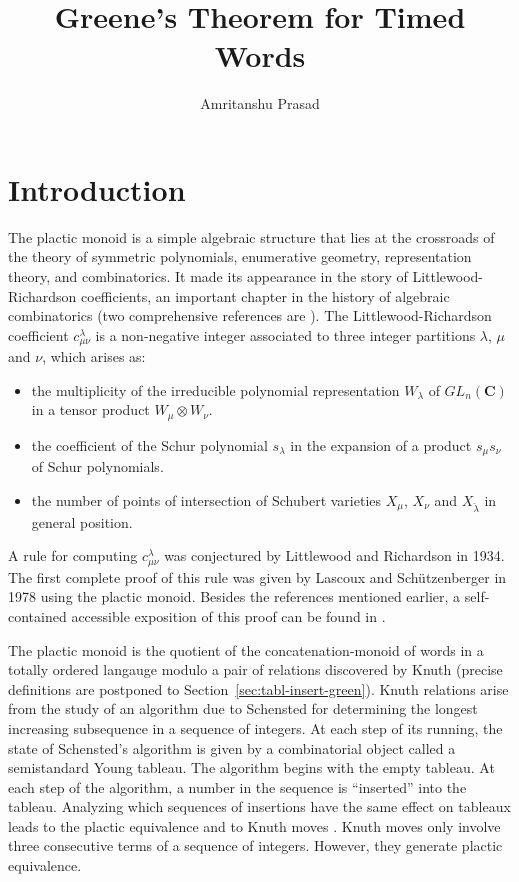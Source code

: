\documentclass[10pt]{amsproc}
\title{Greene's Theorem for Timed Words}
\author{Amritanshu Prasad}
\theoremstyle{definition}
\theoremstyle{remark}
\begin{document}
\maketitle
\section{Introduction}
\label{sec:intro}
The plactic monoid is a simple algebraic structure that lies at the crossroads of the theory of symmetric polynomials, enumerative geometry, representation theory, and combinatorics.
It made its appearance in the story of Littlewood-Richardson coefficients, an important chapter in the history of algebraic combinatorics (two comprehensive references are \cite{fulton,manivel}).
The Littlewood-Richardson coefficient $c^\lambda_{\mu\nu}$ is a non-negative integer associated to three integer partitions $\lambda$, $\mu$ and $\nu$, which arises as:
\begin{itemize}
\item the multiplicity of the irreducible polynomial representation $W_\lambda$ of $GL_n(\mathbf C)$ in a tensor product $W_\mu\otimes W_\nu$.
\item the coefficient of the Schur polynomial $s_\lambda$ in the expansion of a product $s_\mu s_\nu$ of Schur polynomials.
\item the number of points  of intersection of Schubert varieties $X_\mu$, $X_\nu$ and $X_{\check\lambda}$ in general position.
\end{itemize}
A rule for computing $c^\lambda_{\mu\nu}$ was conjectured by Littlewood and Richardson in 1934.
The first complete proof of this rule was given by Lascoux and Sch\"utzenberger \cite{plaxique} in 1978 using the plactic monoid.
Besides the references mentioned earlier, a self-contained accessible exposition of this proof can be found in \cite{schur_poly}.

The plactic monoid is the quotient of the concatenation-monoid of words in a totally ordered langauge modulo a pair of relations discovered by Knuth (precise definitions are postponed to Section~\ref{sec:tabl-insert-green}).
Knuth relations arise from the study of an algorithm due to Schensted \cite{schensted} for determining the longest increasing subsequence in a sequence of integers.
At each step of its running, the state of Schensted's algorithm is given by a combinatorial object called a semistandard Young tableau.
The algorithm begins with the empty tableau.
At each step of the algorithm, a number in the sequence is ``inserted'' into the tableau.
Analyzing which sequences of insertions have the same effect on tableaux leads to the plactic equivalence and to Knuth moves \cite[Section~6]{knuth}.
Knuth moves only involve three consecutive terms of a sequence of integers.
However, they generate plactic equivalence.
\end{document}
